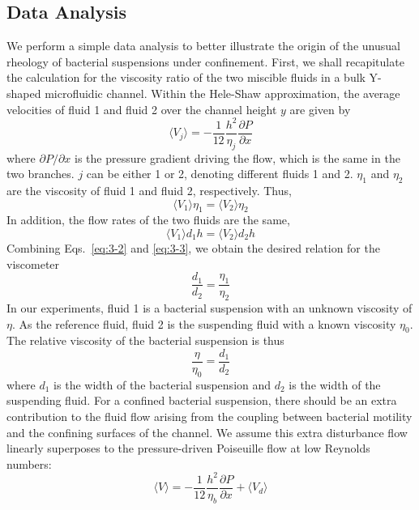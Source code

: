 \subsection{Data Analysis}
We perform a simple data analysis to better illustrate the origin of the unusual rheology of bacterial suspensions under confinement.
First, we shall recapitulate the calculation for the viscosity ratio of the two miscible fluids in a bulk Y-shaped microfluidic channel. Within the Hele-Shaw approximation, the average velocities of fluid 1 and fluid 2 over the channel height $y$ are given by \cite{Lamb1932}
\begin{equation}
  \langle V_j \rangle = -\frac{1}{12}\frac{h^2}{\eta_j}\frac{\partial P}{\partial x}
\end{equation}
where $\partial P/\partial x$ is the pressure gradient driving the flow, which is the same in the two branches. $j$ can be either 1 or 2, denoting different fluids 1 and 2. $\eta_1$ and $\eta_2$ are the viscosity of fluid 1 and fluid 2, respectively. Thus,
\begin{equation}
  \label{eq:3-2}
  \langle V_1 \rangle \eta_1 = \langle V_2 \rangle \eta_2
\end{equation}
In addition, the flow rates of the two fluids are the same,
\begin{equation}
  \label{eq:3-3}
  \langle V_1 \rangle d_1 h = \langle V_2 \rangle d_2 h
\end{equation}
Combining Eqs.~\ref{eq:3-2} and \ref{eq:3-3}, we obtain the desired relation for the viscometer
$$
	\frac{d_1}{d_2} = \frac{\eta_1}{\eta_2}
$$
In our experiments, fluid 1 is a bacterial suspension with an unknown viscosity of $\eta$. As the reference fluid, fluid 2 is the suspending fluid with a known viscosity $\eta_0$. The relative viscosity of the bacterial suspension is thus \cite{Gachelin2013}
\begin{equation}
  \label{eq:3-4}
  \frac{\eta}{\eta_0} = \frac{d_1}{d_2}
\end{equation}
where $d_1$ is the width of the bacterial suspension and $d_2$ is the width of the suspending fluid. For a confined bacterial suspension, there should be an extra contribution to the fluid flow arising from the coupling between bacterial motility and the confining surfaces of the channel. We assume this extra disturbance flow linearly superposes to the pressure-driven Poiseuille flow at low Reynolds numbers:
\begin{equation}
  \label{eq:3-5}
  \langle V \rangle = -\frac{1}{12}\frac{h^2}{\eta_b}\frac{\partial P}{\partial x} + \langle V_d \rangle
\end{equation}
